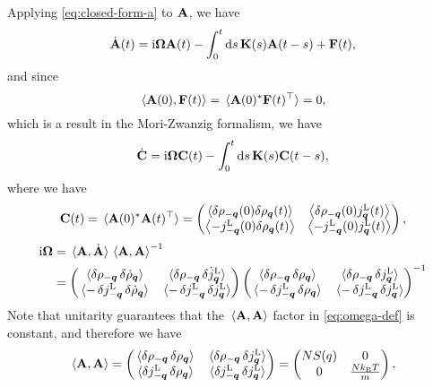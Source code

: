 \documentclass[hyperref, a4paper]{article}
\newcommand*{\ii}{\mathrm{i}}
\begin{document}
Applying \eqref{eq:closed-form-a} to $\vb{A}$, we have 
\[
    \dot{\vb{A}}(t)= \ii \vb{\Omega} \vb{A}(t) - \int_{0}^{t} \dd{s} \vb{K}(s) \vb{A}(t-s)+ \vb{F}(t),
\]
and since 
\[
    \expval*{\vb{A}(0), \vb{F}(t)} = \expval*{\vb{A}(0)^* \vb{F}(t)^\top} = 0, 
\]
which is a result in the Mori-Zwanzig formalism, we have 
\begin{equation}
    \dot{\vb{C}} = \ii \vb{\Omega} \vb{C}(t) - \int_{0}^{t} \dd{s} \vb{K}(s) \vb{C}(t-s),
    \label{eq:matrix-eq}
\end{equation}
where we have 
\begin{equation}
    \vb{C}(t) = \expval*{\vb{A}(0)^* \vb{A}(t)^\top} = \pmqty{\left\langle\delta \rho_{-\vb*{q}}(0) \delta \rho_{\vb*{q}}(t)\right\rangle & \left\langle\delta \rho_{-\vb*{q}}(0) j_{\vb*{q}}^\text{L}(t)\right\rangle \\
    \left\langle - j_{-\vb*{q}}^\text{L}(0) \delta \rho_{\vb*{q}}(t)\right\rangle & \left\langle - j_{-\vb*{q}}^\text{L}(0) j_{\vb*{q}}^\text{L}(t)\right\rangle},
    \label{eq:c-eq}
\end{equation}
\begin{equation}
    \begin{aligned}
        \ii \vb{\Omega} &= \expval*{\vb{A}, \dot{\vb{A}}} \expval*{\vb{A}, \vb{A}}^{-1} \\
        &= \pmqty{ 
            \expval*{\var{\rho_{-\vb*{q}}} \var{\dot{\rho}_{\vb*{q}}} } &
            \expval*{\var{\rho_{-\vb*{q}}} \var{\dot{j}^\text{L}_{\vb*{q}}} } \\
            \expval*{-\var{j^\text{L}_{-\vb*{q}}} \var{\dot{\rho}_{\vb*{q}}} } &
            \expval*{-\var{j^\text{L}_{-\vb*{q}}} \var{\dot{j}^\text{L}_{\vb*{q}}} }} 
        \pmqty{ 
            \expval*{\var{\rho_{-\vb*{q}}} \var{{\rho}_{\vb*{q}}} } &
            \expval*{\var{\rho_{-\vb*{q}}} \var{{j}^\text{L}_{\vb*{q}}} } \\
            \expval*{-\var{j^\text{L}_{-\vb*{q}}} \var{{\rho}_{\vb*{q}}} } &
            \expval*{-\var{j^\text{L}_{-\vb*{q}}} \var{{j}^\text{L}_{\vb*{q}}} } }^{-1}
    \end{aligned}
    \label{eq:omega-def}
\end{equation}
Note that unitarity guarantees that the $\expval*{\vb{A}, \vb{A}}$ factor in \eqref{eq:omega-def} is constant,
and therefore we have 
\begin{equation}
    \expval*{\vb{A}, \vb{A}} = \pmqty{ 
            \expval*{\var{\rho_{-\vb*{q}}} \var{{\rho}_{\vb*{q}}} } &
            \expval*{\var{\rho_{-\vb*{q}}} \var{{j}^\text{L}_{\vb*{q}}} } \\
            \expval*{\var{j^\text{L}_{-\vb*{q}}} \var{{\rho}_{\vb*{q}}} } &
            \expval*{\var{j^\text{L}_{-\vb*{q}}} \var{{j}^\text{L}_{\vb*{q}}} } 
        } = \pmqty{
            N S(q) & 0 \\ 
            0 &  \frac{N k_\text{B} T}{m}
        },
    \label{eq:normalize}
\end{equation}
\end{document}
